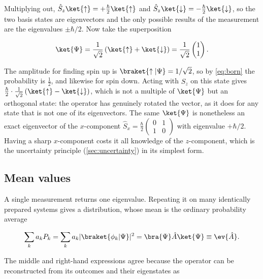         Multiplying out, $\hat{S}_{z}\ket{\uparrow} = +\tfrac{\hbar}{2}\ket{\uparrow}$ and $\hat{S}_{z}\ket{\downarrow} = -\tfrac{\hbar}{2}\ket{\downarrow}$, so the two basis states are eigenvectors and the only possible results of the measurement are the eigenvalues $\pm\hbar/2$. Now take the superposition

        \begin{equation*}
            \ket{\Psi} = \frac{1}{\sqrt{2}}\left(\ket{\uparrow} + \ket{\downarrow}\right)
            = \frac{1}{\sqrt{2}}\begin{pmatrix} 1 \\ 1 \end{pmatrix}.
        \end{equation*}

        The amplitude for finding spin up is $\braket{\uparrow|\Psi} = 1/\sqrt{2}$, so by \cref{eq:born} the probability is $\tfrac{1}{2}$, and likewise for spin down. Acting with $\hat{S}_{z}$ on this state gives $\tfrac{\hbar}{2}\cdot\tfrac{1}{\sqrt{2}}\left(\ket{\uparrow}-\ket{\downarrow}\right)$, which is not a multiple of $\ket{\Psi}$ but an orthogonal state: the operator has genuinely rotated the vector, as it does for any state that is not one of its eigenvectors. The same $\ket{\Psi}$ is nonetheless an exact eigenvector of the $x$-component
        $\hat{S}_{x} = \tfrac{\hbar}{2}\left(\begin{smallmatrix} 0 & 1 \\ 1 & 0 \end{smallmatrix}\right)$
        with eigenvalue $+\hbar/2$. Having a sharp $x$-component costs it all knowledge of the $z$-component, which is the uncertainty principle (\cref{sec:uncertainty}) in its simplest form.

    \subsection{Mean values}

        A single measurement returns one eigenvalue. Repeating it on many identically prepared systems gives a distribution, whose mean is the ordinary probability average

        \begin{equation*}
            \sum_{k}a_{k}P_{k} = \sum_{k}a_{k}|\braket{\phi_{k}|\Psi}|^{2} = \bra{\Psi}\hat{A}\ket{\Psi} \equiv \ev{\hat{A}} .
        \end{equation*}

        The middle and right-hand expressions agree because the operator can be reconstructed from its outcomes and their eigenstates as

